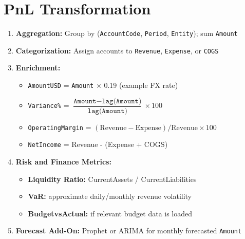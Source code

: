 \documentclass[a4paper,10pt]{article}
\begin{document}
\section{PnL Transformation}
\begin{enumerate}[leftmargin=2em]
    \item \textbf{Aggregation:} Group by (\texttt{AccountCode}, \texttt{Period}, \texttt{Entity}); sum \texttt{Amount}
    \item \textbf{Categorization:} Assign accounts to \texttt{Revenue}, \texttt{Expense}, or \texttt{COGS}
    \item \textbf{Enrichment:}
    \begin{itemize}[leftmargin=1.5em]
        \item \texttt{AmountUSD} = \texttt{Amount} $\times$ 0.19 (example FX rate)
        \item \texttt{Variance\%} = $\dfrac{\texttt{Amount} - \texttt{lag(Amount)}}{\texttt{lag(Amount)}} \times 100$
        \item \texttt{OperatingMargin} = $(\text{Revenue} - \text{Expense}) / \text{Revenue} \times 100$
        \item \texttt{NetIncome} = Revenue - (Expense + COGS)
    \end{itemize}
    \item \textbf{Risk and Finance Metrics:}
    \begin{itemize}[leftmargin=1.5em]
        \item \textbf{Liquidity Ratio:} CurrentAssets / CurrentLiabilities
        \item \textbf{VaR:} approximate daily/monthly revenue volatility
        \item \textbf{BudgetvsActual:} if relevant budget data is loaded
    \end{itemize}
    \item \textbf{Forecast Add-On:} Prophet or ARIMA for monthly forecasted \texttt{Amount}
\end{enumerate}
\end{document}
